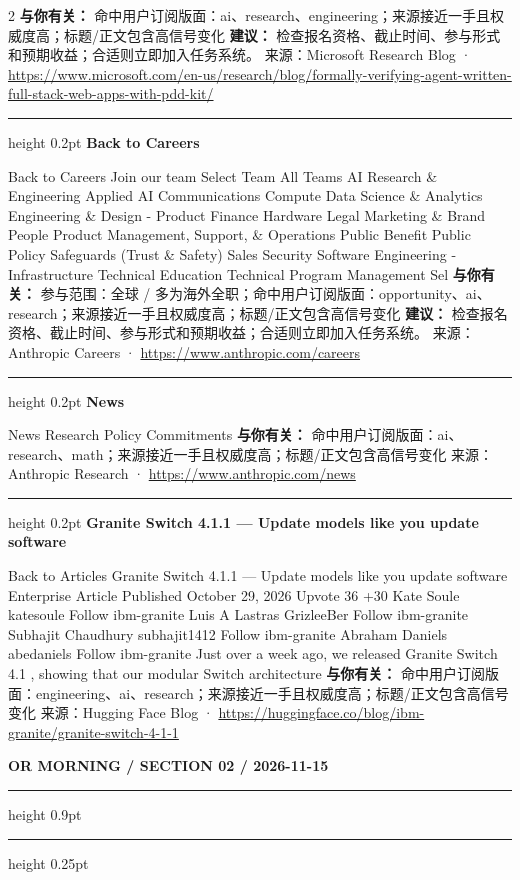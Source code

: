 \documentclass[10.5pt]{ctexart}
\begin{document}
\begin{multicols}{2}
\textbf{与你有关：} 命中用户订阅版面：ai、research、engineering；来源接近一手且权威度高；标题/正文包含高信号变化
\textbf{建议：} 检查报名资格、截止时间、参与形式和预期收益；合适则立即加入任务系统。
{\footnotesize\color{ormuted} 来源：Microsoft Research Blog · \url{https://www.microsoft.com/en-us/research/blog/formally-verifying-agent-written-full-stack-web-apps-with-pdd-kit/}}
\vspace{2mm}
\hrule height 0.2pt
\vspace{2mm}
{\large\bfseries Back to Careers}\par
Back to Careers Join our team Select Team All Teams AI Research \& Engineering Applied AI Communications Compute Data Science \& Analytics Engineering \& Design - Product Finance Hardware Legal Marketing \& Brand People Product Management, Support, \& Operations Public Benefit Public Policy Safeguards (Trust \& Safety) Sales Security Software Engineering - Infrastructure Technical Education Technical Program Management Sel
\textbf{与你有关：} 参与范围：全球 / 多为海外全职；命中用户订阅版面：opportunity、ai、research；来源接近一手且权威度高；标题/正文包含高信号变化
\textbf{建议：} 检查报名资格、截止时间、参与形式和预期收益；合适则立即加入任务系统。
{\footnotesize\color{ormuted} 来源：Anthropic Careers · \url{https://www.anthropic.com/careers}}
\vspace{2mm}
\hrule height 0.2pt
\vspace{2mm}
{\large\bfseries News}\par
News Research Policy Commitments
\textbf{与你有关：} 命中用户订阅版面：ai、research、math；来源接近一手且权威度高；标题/正文包含高信号变化
{\footnotesize\color{ormuted} 来源：Anthropic Research · \url{https://www.anthropic.com/news}}
\vspace{2mm}
\hrule height 0.2pt
\vspace{2mm}
{\large\bfseries Granite Switch 4.1.1 — Update models like you update software}\par
Back to Articles Granite Switch 4.1.1 — Update models like you update software Enterprise Article Published October 29, 2026 Upvote 36 +30 Kate Soule katesoule Follow ibm-granite Luis A Lastras GrizleeBer Follow ibm-granite Subhajit Chaudhury subhajit1412 Follow ibm-granite Abraham Daniels abedaniels Follow ibm-granite Just over a week ago, we released Granite Switch 4.1 , showing that our modular Switch architecture
\textbf{与你有关：} 命中用户订阅版面：engineering、ai、research；来源接近一手且权威度高；标题/正文包含高信号变化
{\footnotesize\color{ormuted} 来源：Hugging Face Blog · \url{https://huggingface.co/blog/ibm-granite/granite-switch-4-1-1}}
\end{multicols}
\newpage
{\small\bfseries OR MORNING / SECTION 02 / 2026-11-15}
\vspace{2mm}
\hrule height 0.9pt
\vspace{1.5mm}
\hrule height 0.25pt
\vspace{4mm}
\end{document}
